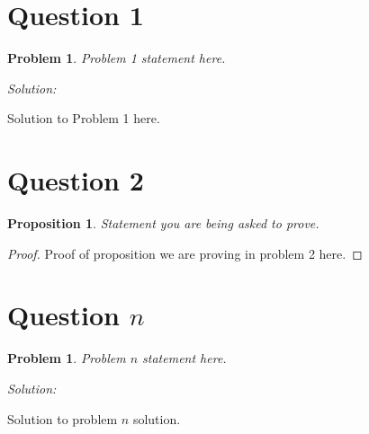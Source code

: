 \documentclass[12pt, letterpaper]{article}
\newenvironment{sol}
    {\emph{Solution:}
    }
    {
    }
\theoremstyle{plain}
\newtheorem{prop}[theorem]{Proposition}
\newtheorem{prob}[theorem]{Problem}
\theoremstyle{definition}
\theoremstyle{remark}
\begin{document}
\section{Question 1} %

\begin{prob} %
Problem 1 statement here.
\end{prob}

\begin{sol}
Solution to Problem 1 here.
\end{sol}

\section{Question 2} %

\begin{prop}
Statement you are being asked to prove.
\end{prop}

\begin{proof}
Proof of proposition we are proving in problem 2 here.
\end{proof}

\section{Question $n$} %

\begin{prob}
Problem $n$ statement here.
\end{prob}

\begin{sol}
Solution to problem $n$ solution.
\end{sol}
\end{document}
